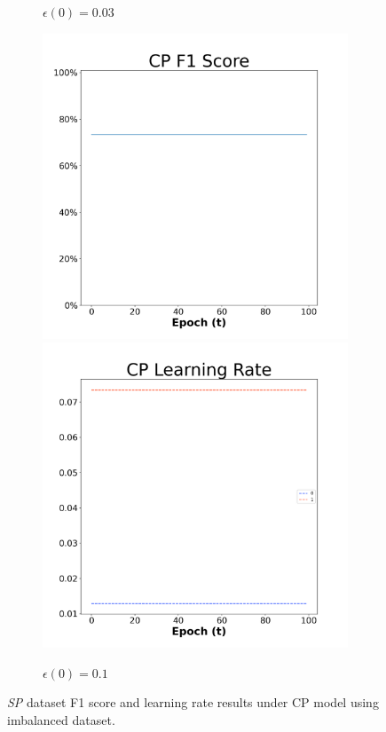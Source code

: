 \begin{figure}[H]
\begin{subfigure}{0.3\textwidth}
\caption{$\epsilon(0)=0.03$}
\end{subfigure}\hfil %
\begin{subfigure}{0.3\textwidth}
\includegraphics[width=\linewidth]{images/exper2/SP/CP_0.1_f1.png}
\includegraphics[width=\linewidth]{images/exper2/SP/CP_0.1_lr.png}
\caption{$\epsilon(0)=0.1$}
\end{subfigure}

\caption{\textit{SP} dataset F1 score and learning rate results under CP model using imbalanced dataset.}
\end{figure}


